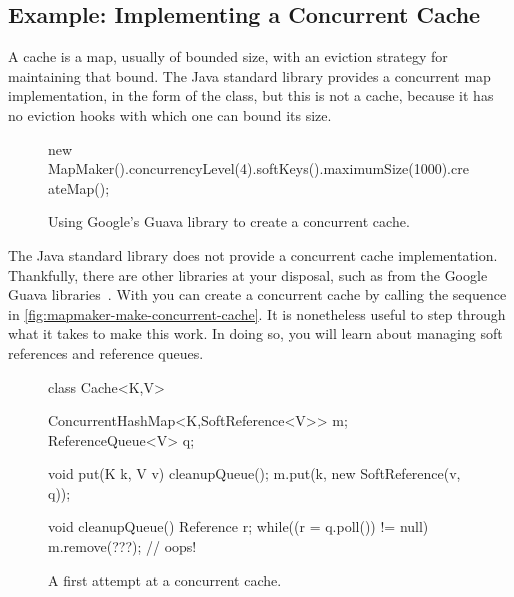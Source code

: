 \subsection{Example: Implementing a Concurrent Cache}
\label{sec:lifetime-management-concurrency-issues}

A cache is a map, usually of bounded size, with an eviction strategy for
maintaining that bound. The Java standard library provides a
concurrent map implementation, in the form of the 
class, but this is not a cache, because it has no eviction hooks with which one
can bound its size.

\begin{wrapfigure}[9]{r}{0.34\textwidth}
\centering
\begin{framedlisting}
new MapMaker().concurrencyLevel(4).softKeys().maximumSize(1000).createMap();
\end{framedlisting}
\caption{Using Google's Guava library to create a concurrent cache.}
\label{fig:mapmaker-make-concurrent-cache}
\end{wrapfigure}
The Java standard library does not provide a concurrent cache implementation.
Thankfully, there are other libraries at your disposal, such as 
from the Google Guava libraries~\cite{google-guava}. With  you can create
a concurrent cache by calling the sequence in
\autoref{fig:mapmaker-make-concurrent-cache}. It is nonetheless useful to step
through what it takes to make this work. In doing so, you will learn about
managing soft references and reference queues.

\begin{wrapfigure}{r}{0.61\textwidth}
\centering
\begin{figurelisting}
class Cache<K,V> {
  ConcurrentHashMap<K,SoftReference<V>> m;
  ReferenceQueue<V> q;
   
  void put(K k, V v) {
    cleanupQueue();
    m.put(k, new SoftReference(v, q));
  }
  
  void cleanupQueue() {
    Reference r;
    while((r = q.poll()) != null)
       m.remove(???); // oops!
  }
}
\end{figurelisting}
\caption{A first attempt at a concurrent cache.}
\label{fig:concurrent-cache-first-attempt}
\end{wrapfigure}

